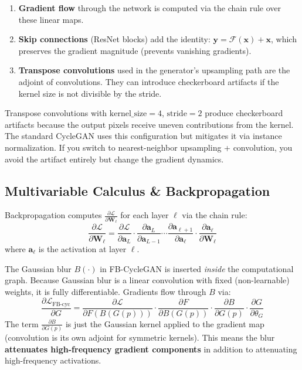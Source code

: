 \documentclass[11pt,a4paper]{article}
\theoremstyle{definition}
\begin{document}
\begin{enumerate}[label=(\alph*)]
    \item \textbf{Gradient flow} through the network is computed via the chain rule over these linear maps.
    \item \textbf{Skip connections} (ResNet blocks) add the identity: $\bm{y} = \mathcal{F}(\bm{x}) + \bm{x}$, which preserves the gradient magnitude (prevents vanishing gradients).
    \item \textbf{Transpose convolutions} used in the generator's upsampling path are the adjoint of convolutions. They can introduce checkerboard artifacts if the kernel size is not divisible by the stride.
\end{enumerate}

\begin{edgecase}
Transpose convolutions with $\text{kernel\_size} = 4$, $\text{stride} = 2$ produce checkerboard artifacts because the output pixels receive uneven contributions from the kernel. The standard CycleGAN uses this configuration but mitigates it via instance normalization. If you switch to nearest-neighbor upsampling + convolution, you avoid the artifact entirely but change the gradient dynamics.
\end{edgecase}

\subsection{Multivariable Calculus \& Backpropagation}

Backpropagation computes $\frac{\partial \mathcal{L}}{\partial \bm{W}_\ell}$ for each layer $\ell$ via the chain rule:
\begin{equation}
    \frac{\partial \mathcal{L}}{\partial \bm{W}_\ell} = \frac{\partial \mathcal{L}}{\partial \bm{a}_L} \cdot \frac{\partial \bm{a}_L}{\partial \bm{a}_{L-1}} \cdots \frac{\partial \bm{a}_{\ell+1}}{\partial \bm{a}_\ell} \cdot \frac{\partial \bm{a}_\ell}{\partial \bm{W}_\ell}
\end{equation}
where $\bm{a}_\ell$ is the activation at layer $\ell$.

\begin{keyinsight}
The Gaussian blur $B(\cdot)$ in FB-CycleGAN is inserted \emph{inside} the computational graph. Because Gaussian blur is a linear convolution with fixed (non-learnable) weights, it is fully differentiable. Gradients flow through $B$ via:
\[
    \frac{\partial \mathcal{L}_{\text{FB-cyc}}}{\partial G} = \frac{\partial \mathcal{L}}{\partial F(B(G(p)))} \cdot \frac{\partial F}{\partial B(G(p))} \cdot \frac{\partial B}{\partial G(p)} \cdot \frac{\partial G}{\partial \theta_G}
\]
The term $\frac{\partial B}{\partial G(p)}$ is just the Gaussian kernel applied to the gradient map (convolution is its own adjoint for symmetric kernels). This means the blur \textbf{attenuates high-frequency gradient components} in addition to attenuating high-frequency activations.
\end{keyinsight}
\end{document}
